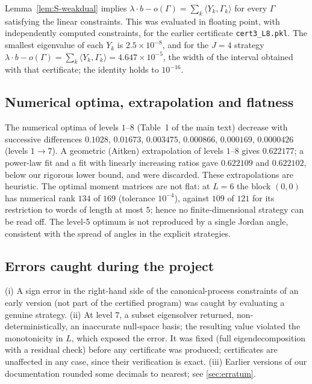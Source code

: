 \documentclass[aps,pra,onecolumn,notitlepage,superscriptaddress,longbibliography,nofootinbib,11pt]{revtex4-2}
\theoremstyle{remark}
\newcommand{\file}[1]{\texttt{#1}}
\begin{document}
Lemma~\ref{lem:S-weakdual} implies $\lambda\cdot b-o(\Gamma)=\sum_k\langle Y_k,\Gamma_k\rangle$ for every $\Gamma$ satisfying the linear constraints. This was evaluated in floating point, with independently computed constraints, for the earlier certificate \file{cert3\_L8.pkl}. The smallest eigenvalue of each $Y_k$ is $2.5\times10^{-8}$, and for the $J=4$ strategy $\lambda\cdot b-o(\Gamma)=\sum_k\langle Y_k,\Gamma_k\rangle=4.647\times10^{-5}$, the width of the interval obtained with that certificate; the identity holds to $10^{-16}$.

\subsection{Numerical optima, extrapolation and flatness}

The numerical optima of levels $1$--$8$ (Table~1 of the main text) decrease with successive differences $0.1028$, $0.01673$, $0.003475$, $0.000866$, $0.000169$, $0.0000426$ (levels $1\to7$). A geometric (Aitken) extrapolation of levels $1$--$8$ gives $0.622177$; a power-law fit and a fit with linearly increasing ratios gave $0.622109$ and $0.622102$, below our rigorous lower bound, and were discarded. These extrapolations are heuristic. The optimal moment matrices are not flat: at $L=6$ the block $(0,0)$ has numerical rank $134$ of $169$ (tolerance $10^{-4}$), against $109$ of $121$ for its restriction to words of length at most $5$; hence no finite-dimensional strategy can be read off. The level-5 optimum is not reproduced by a single Jordan angle, consistent with the spread of angles in the explicit strategies.

\subsection{Errors caught during the project}

(i) A sign error in the right-hand side of the canonical-process constraints of an early version (not part of the certified program) was caught by evaluating a genuine strategy. (ii) At level $7$, a subset eigensolver returned, non-deterministically, an inaccurate null-space basis; the resulting value violated the monotonicity in $L$, which exposed the error. It was fixed (full eigendecomposition with a residual check) before any certificate was produced; certificates are unaffected in any case, since their verification is exact. (iii) Earlier versions of our documentation rounded some decimals to nearest; see \ref{sec:erratum}.
\end{document}
